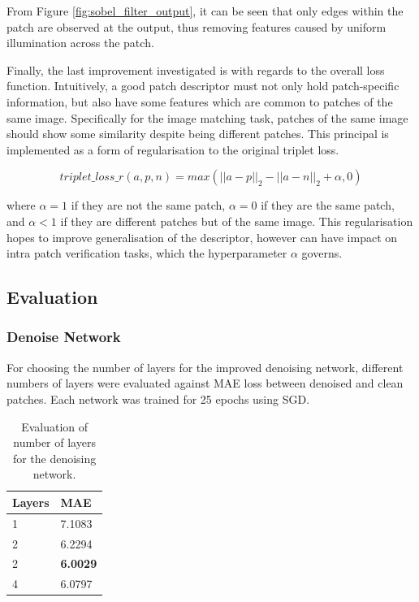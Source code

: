 \documentclass[10pt,twocolumn,letterpaper]{article}
\begin{document}
From Figure \ref{fig:sobel_filter_output}, it can be seen that only edges within the patch are observed at the output, thus removing features caused by uniform illumination across the patch.



Finally, the last improvement investigated is with regards to the overall loss function. Intuitively, a good patch descriptor must not only hold patch-specific information, but also have some features which are common to patches of the same image. Specifically for the image matching task, patches of the same image should show some similarity despite being different patches. This principal is implemented as a form of regularisation to the original triplet loss.

\vspace{-0.5cm}
\begin{equation}
    triplet\_loss\_r(a,p,n) = max(|| a - p ||_2 - || a - n ||_2 + \alpha,0) 
\end{equation}
\vspace{-0.2cm}

where $\alpha=1$ if they are not the same patch, $\alpha=0$ if they are the same patch, and $\alpha<1$ if they are different patches but of the same image. 
This regularisation hopes to improve generalisation of the descriptor, however can have impact on intra patch verification tasks, which the hyperparameter $\alpha$ governs.

 
\subsection{Evaluation}
\label{sec:evaluation}

\subsubsection{Denoise Network}

For choosing the number of layers for the improved denoising network, different numbers of layers were evaluated against MAE loss between denoised and clean patches. Each network was trained for 25 epochs using SGD.

\begin{table}[H]
\centering
\begin{tabular}{|l|l|}
\hline
\textbf{Layers} & \textbf{MAE}  \\ \hline
1             & 7.1083   \\ 
2             & 6.2294   \\ 
2             & \textbf{6.0029}   \\ 
4             & 6.0797   \\ \hline
\end{tabular}
\caption{Evaluation of number of layers for the denoising network.}
\label{tab:denoise_loss}
\end{table}
\end{document}

